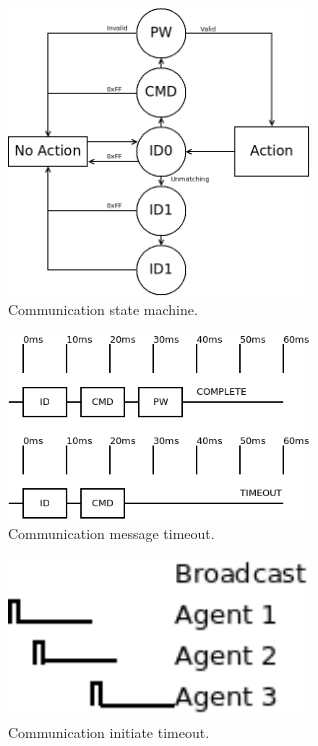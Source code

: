 \documentclass[a4paper]{article}
\begin{document}
\begin{figure}[h]
   \centering
   \label{fig_communications_sm}
   \includegraphics[width=8cm,keepaspectratio]{communications/communications_sm.png} 
   \caption{Communication state machine.}
\end{figure}

\begin{figure}[h]
   \centering
   \label{fig_communications_wave}
   \includegraphics[width=8cm,keepaspectratio]{communications/communications_wave.png} 
   \caption{Communication message timeout.}
\end{figure}

\begin{figure}[h]
   \centering
   \label{fig_communications_time}
   \includegraphics[width=8cm,keepaspectratio]{communications/communications_time.png} 
   \caption{Communication initiate timeout.}
\end{figure}
\end{document}
